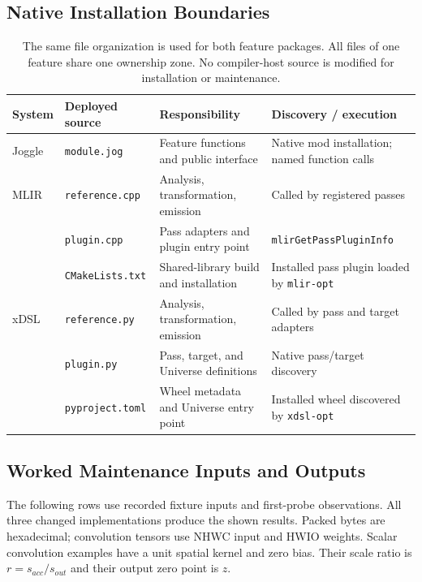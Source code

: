 \subsection{Native Installation Boundaries}
\begin{table}[!htbp]
  \centering\normalsize
  \caption{The same file organization is used for both feature packages.
  All files of one feature share one ownership zone. No compiler-host source
  is modified for installation or maintenance.}
  \label{tab:package-installation}
  \setlength{\tabcolsep}{5pt}
  \renewcommand{\arraystretch}{1.2}
  \begin{tabular}{@{}lp{}p{}p{}@{}}
    \toprule
    System & Deployed source & Responsibility & Discovery / execution \\
    \midrule
    Joggle & \texttt{module.jog} & Feature functions and public interface & Native mod installation; named function calls \\
    \midrule
    MLIR & \texttt{reference.cpp} & Analysis, transformation, emission & Called by registered passes \\
    & \texttt{plugin.cpp} & Pass adapters and plugin entry point & \texttt{mlirGetPassPluginInfo} \\
    & \texttt{CMakeLists.txt} & Shared-library build and installation & Installed pass plugin loaded by \texttt{mlir-opt} \\
    \midrule
    xDSL & \texttt{reference.py} & Analysis, transformation, emission & Called by pass and target adapters \\
    & \texttt{plugin.py} & Pass, target, and Universe definitions & Native pass/target discovery \\
    & \texttt{pyproject.toml} & Wheel metadata and Universe entry point & Installed wheel discovered by \texttt{xdsl-opt} \\
    \bottomrule
  \end{tabular}
\end{table}

\clearpage
\subsection{Worked Maintenance Inputs and Outputs}
The following rows use recorded fixture inputs and first-probe observations.
All three changed implementations produce the shown results. Packed bytes are
hexadecimal; convolution tensors use NHWC input and HWIO weights. Scalar
convolution examples have a unit spatial kernel and zero bias. Their scale
ratio is $r=s_{acc}/s_{out}$ and their output zero point is $z$.

